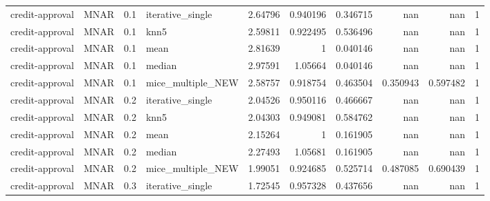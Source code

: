 \begin{table}[ht]
\begin{tabular}{llrlrrrrrr}
 credit-approval & MNAR        &         0.1 & iterative\_single  &       2.64796  &             0.940196 &              0.346715  &                       nan        &                    nan         &         1 \\
 credit-approval & MNAR        &         0.1 & knn5              &       2.59811  &             0.922495 &              0.536496  &                       nan        &                    nan         &         1 \\
 credit-approval & MNAR        &         0.1 & mean              &       2.81639  &             1        &              0.040146  &                       nan        &                    nan         &         1 \\
 credit-approval & MNAR        &         0.1 & median            &       2.97591  &             1.05664  &              0.040146  &                       nan        &                    nan         &         1 \\
 credit-approval & MNAR        &         0.1 & mice\_multiple\_NEW &       2.58757  &             0.918754 &              0.463504  &                         0.350943 &                      0.597482  &         1 \\
 credit-approval & MNAR        &         0.2 & iterative\_single  &       2.04526  &             0.950116 &              0.466667  &                       nan        &                    nan         &         1 \\
 credit-approval & MNAR        &         0.2 & knn5              &       2.04303  &             0.949081 &              0.584762  &                       nan        &                    nan         &         1 \\
 credit-approval & MNAR        &         0.2 & mean              &       2.15264  &             1        &              0.161905  &                       nan        &                    nan         &         1 \\
 credit-approval & MNAR        &         0.2 & median            &       2.27493  &             1.05681  &              0.161905  &                       nan        &                    nan         &         1 \\
 credit-approval & MNAR        &         0.2 & mice\_multiple\_NEW &       1.99051  &             0.924685 &              0.525714  &                         0.487085 &                      0.690439  &         1 \\
 credit-approval & MNAR        &         0.3 & iterative\_single  &       1.72545  &             0.957328 &              0.437656  &                       nan        &                    nan         &         1 \\

\end{tabular}
\end{table}

